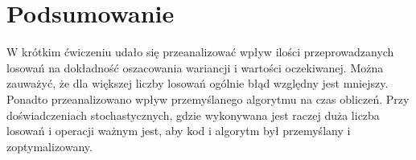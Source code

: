 \documentclass[a4paper,12pt]{article}
\begin{document}
    \newpage

    \section{Podsumowanie}

    W krótkim ćwiczeniu udało się przeanalizować wpływ ilości przeprowadzanych losowań na dokładność oszacowania wariancji i wartości oczekiwanej.
    Można zauważyć, że dla większej liczby losowań ogólnie błąd względny jest mniejszy. 
    Ponadto przeanalizowano wpływ przemyślanego algorytmu na czas obliczeń.
    Przy doświadczeniach stochastycznych, gdzie wykonywana jest raczej duża liczba losowań i operacji ważnym jest, aby kod i algorytm był przemyślany i zoptymalizowany.
\end{document}
